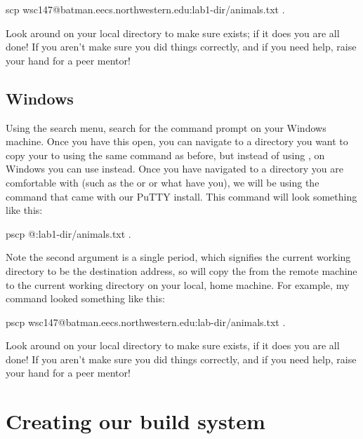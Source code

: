 \documentclass{tufte-handout}
\begin{document}
\begin{CmdLine}
  \prompt scp wsc147@batman.eecs.northwestern.edu:lab1-dir/animals.txt .
\end{CmdLine}

Look around on your local directory to make sure 
exists; if it does you are all done!  If you aren't make sure you did
things correctly, and if you need help, raise your hand for a peer
mentor!

\subsection{Windows}

Using the search menu, search for the command prompt on your Windows
machine.  Once you have this open, you can navigate to a directory you
want to copy your  to using the same 
command as before, but instead of using , on Windows you
can use  instead. Once you have navigated to a directory
you are comfortable with (such as the  or
 or what have you), we will be using the
command that came with our PuTTY install.  This command will look
something like this:

\begin{CmdLine}
  \prompt pscp @:lab1-dir/animals.txt .
\end{CmdLine}

\noindent
Note the second argument is a single period, which signifies the current
working directory to be the destination address, so  will copy the
 from the remote machine to the current working
directory on your local, home machine. For example, my  command
looked something like this:

\begin{CmdLine}
  \prompt pscp wsc147@batman.eecs.northwestern.edu:lab-dir/animals.txt .
\end{CmdLine}

Look around on your local directory to make sure 
exists, if it does you are all done! If you aren't make sure you did
things correctly, and if you need help, raise your hand for a peer
mentor!

\section{Creating our build system}
\end{document}
